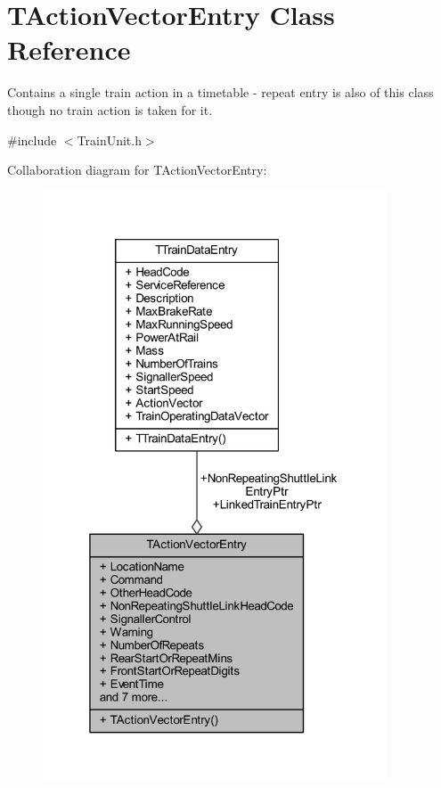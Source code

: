 \hypertarget{class_t_action_vector_entry}{}\section{T\+Action\+Vector\+Entry Class Reference}
\label{class_t_action_vector_entry}


Contains a single train action in a timetable -\/ repeat entry is also of this class though no train action is taken for it.  




{\ttfamily \#include $<$Train\+Unit.\+h$>$}



Collaboration diagram for T\+Action\+Vector\+Entry\+:\nopagebreak
\begin{figure}[H]
\begin{center}
\leavevmode
\includegraphics[width=289pt]{class_t_action_vector_entry__coll__graph}
\end{center}
\end{figure}
